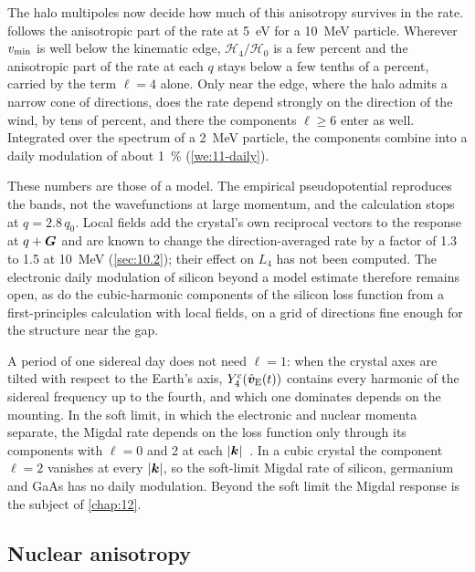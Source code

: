 The halo multipoles now decide how much of this anisotropy survives in the rate.  follows the anisotropic part of the rate at \SI{5}{eV} for a \SI{10}{MeV} particle. Wherever $v_{\mathrm{min}}$ is well below the kinematic edge, $\mathcal{H}_4/\mathcal{H}_0$ is a few percent and the anisotropic part of the rate at each $q$ stays below a few tenths of a percent, carried by the term $\ell = 4$ alone. Only near the edge, where the halo admits a narrow cone of directions, does the rate depend strongly on the direction of the wind, by tens of percent, and there the components $\ell \ge 6$ enter as well. Integrated over the spectrum of a \SI{2}{MeV} particle, the components combine into a daily modulation of about \SI{1}{\percent} (\cref{we:11-daily}).

These numbers are those of a model. The empirical pseudopotential reproduces the bands, not the wavefunctions at large momentum, and the calculation stops at $q = 2.8\,q_0$. Local fields add the crystal's own reciprocal vectors to the response at $q + \bm{G}$ and are known to change the direction-averaged rate by a factor of 1.3 to 1.5 at \SI{10}{MeV} (\cref{sec:10.2}); their effect on $L_4$ has not been computed. The electronic daily modulation of silicon beyond a model estimate therefore remains open, as do the cubic-harmonic components of the silicon loss function from a first-principles calculation with local fields, on a grid of directions fine enough for the structure near the gap.

A period of one sidereal day does not need $\ell = 1$: when the crystal axes are tilted with respect to the Earth's axis, $Y^{\mathrm{c}}_4(\hat{\bm{v}}_{\mathrm{E}}(t))$ contains every harmonic of the sidereal frequency up to the fourth, and which one dominates depends on the mounting. In the soft limit, in which the electronic and nuclear momenta separate, the Migdal rate depends on the loss function only through its components with $\ell = 0$ and 2 at each $|\bm{k}|$~\cite[Eqs.~(37)--(41)]{aladulrazzaq2026anisotropic}. In a cubic crystal the component $\ell = 2$ vanishes at every $|\bm{k}|$, so the soft-limit Migdal rate of silicon, germanium and GaAs has no daily modulation. Beyond the soft limit the Migdal response is the subject of \cref{chap:12}.

\subsection{Nuclear anisotropy}

